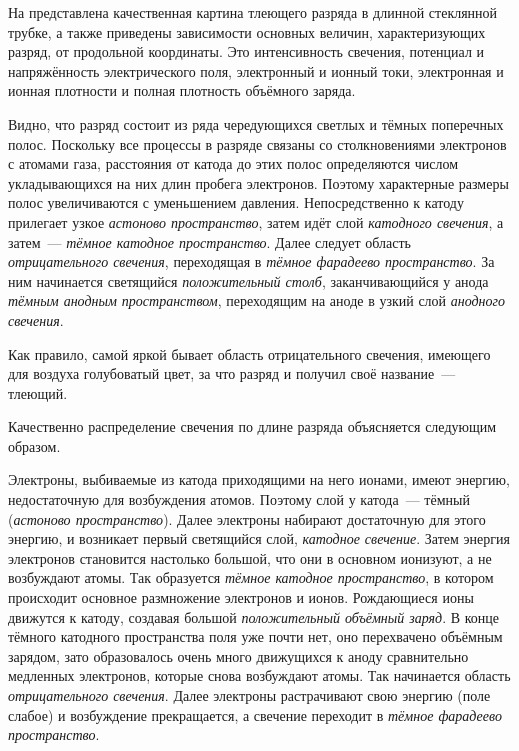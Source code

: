 На  представлена качественная картина тлеющего разряда в длинной стеклянной трубке, а также приведены зависимости
основных величин, характеризующих разряд, от продольной координаты. Это интенсивность свечения, потенциал и
напряжённость электрического поля, электронный и ионный токи, электронная и ионная плотности и полная плотность
объёмного заряда.

Видно, что разряд состоит из ряда чередующихся светлых и тёмных поперечных полос. Поскольку все процессы в разряде
связаны со столкновениями электронов с атомами газа, расстояния от катода до этих полос определяются числом
укладывающихся на них длин пробега электронов. Поэтому характерные размеры полос увеличиваются с уменьшением давления.
Непосредственно к катоду прилегает узкое \textit{астоново пространство}, затем идёт слой \textit{катодного свечения}, а
затем~--- \textit{тёмное катодное пространство}. Далее следует область \textit{отрицательного свечения}, переходящая в
\textit{тёмное фарадеево пространство}. За ним начинается светящийся \textit{положительный столб}, заканчивающийся у анода
\textit{тёмным анодным пространством}, переходящим на аноде в узкий слой \textit{анодного свечения}.

Как правило, самой яркой бывает область отрицательного свечения, имеющего для воздуха голубоватый цвет, за что разряд и
получил своё название~--- тлеющий.

Качественно распределение свечения по длине разряда объясняется следующим образом.

Электроны, выбиваемые из катода приходящими на него ионами, имеют энергию, недостаточную для возбуждения атомов. Поэтому
слой у катода~--- тёмный (\textit{астоново пространство}). Далее электроны набирают достаточную для этого энергию, и
возникает первый светящийся слой, \textit{катодное свечение}. Затем энергия электронов становится настолько большой, что
они в основном ионизуют, а не возбуждают атомы. Так образуется \textit{тёмное катодное пространство}, в котором происходит
основное размножение электронов и ионов. Рождающиеся ионы движутся к катоду, создавая большой \textit{положительный
объёмный заряд}. В конце тёмного катодного пространства поля уже почти нет, оно перехвачено объёмным зарядом, зато
образовалось очень много движущихся к аноду сравнительно медленных электронов, которые снова возбуждают атомы. Так
начинается область \textit{отрицательного свечения}. Далее электроны растрачивают свою энергию (поле слабое) и возбуждение
прекращается, а свечение переходит в \textit{тёмное фарадеево пространство}.

